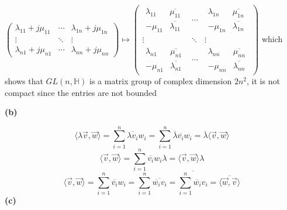 \documentclass[10pt]{article}
\newcommand{\<}[1]{\langle #1 \rangle}
\begin{document}
$\left( {\begin{array}{ccc}
\lambda_{11}+j\mu_{11} &\cdots & \lambda_{1n}+j\mu_{1n}  \\
\vdots & \ddots & \vdots \\
 \lambda_{n1}+j\mu_{n1} &\cdots & \lambda_{nn}+j\mu_{nn}
\end{array} } \right)\mapsto\left( {\begin{array}{ccc}
\begin{array}{cc}\lambda_{11} & \overline{\mu_{11}} \\-\mu_{11} & \overline{\lambda_{11}}\end{array} &\cdots & \begin{array}{cc}\lambda_{1n} & \overline{\mu_{1n}} \\-\mu_{1n} & \overline{\lambda_{1n}}\end{array}   \\
\vdots & \ddots & \vdots \\
\begin{array}{cc}\lambda_{n1} & \overline{\mu_{n1}} \\-\mu_{n1} & \overline{\lambda_{n1}}\end{array}&\cdots &\begin{array}{cc}\lambda_{nn} & \overline{\mu_{nn}} \\-\mu_{nn} & \overline{\lambda_{nn}}\end{array}
\end{array} } \right)$ which shows that $GL(n,\mathbb H)$ is a matrix group of complex dimension $2n^2$, it is not compact since the entries are not bounded \par
\textbf{(b)} \par
$$\<{\lambda\vec{v},\vec{w}}=\sum_{i=1}^n\overline{\lambda v_i}w_i=\sum_{i=1}^n \overline\lambda\overline{v_i} w_i=\overline\lambda\<{\vec{v},\vec{w}}$$
$$\<{\vec{v},\vec{w}}=\sum_{i=1}^n\overline{v_i}w_i\lambda=\<{\vec{v},\vec{w}}\lambda$$
$$\<{\vec{v},\vec{w}}=\sum_{i=1}^n\overline{v_i}w_i=\sum_{i=1}^n \overline{\overline{w_i} v_i}=\overline{\sum_{i=1}^n\overline{w_i} v_i}=\overline{\<{\vec{w},\vec{v}}}$$
\textbf{(c)} \par
\end{document}
